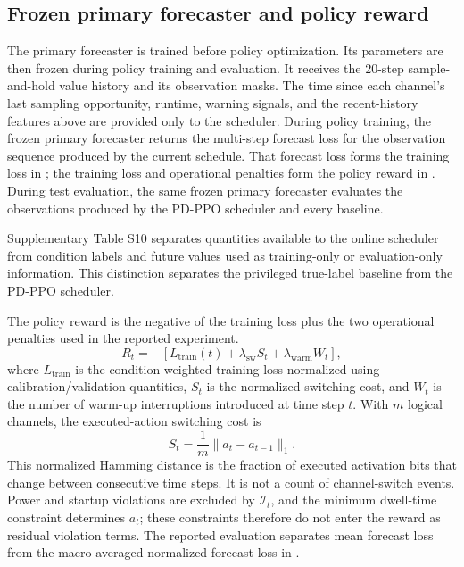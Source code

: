 \subsection{Frozen primary forecaster and policy reward}

The primary forecaster is trained before policy optimization. Its parameters are
then frozen during policy training and evaluation.
It receives the 20-step sample-and-hold value history and its observation masks.
The time since each channel's last sampling opportunity, runtime, warning
signals, and the recent-history features above are provided only to the
scheduler. During policy training, the frozen primary forecaster returns the multi-step
forecast loss for the observation sequence produced by the current schedule.
That forecast loss forms the training loss in
; the training loss and operational
penalties form the policy reward in . During test
evaluation, the same frozen primary forecaster evaluates the observations produced
by the PD-PPO scheduler and every baseline.

Supplementary Table S10 separates quantities available to the online scheduler
from condition labels and future values used as training-only or evaluation-only
information. This distinction separates the privileged true-label baseline from the
PD-PPO scheduler.

The policy reward is the negative of the training loss plus the two operational
penalties used in the reported experiment.
\begin{equation}
  R_t
  =
  -\left[
  L_{\mathrm{train}}(t)
  + \lambda_{\mathrm{sw}} S_t
  + \lambda_{\mathrm{warm}} W_t
  \right],
  \label{eq:training_reward}
\end{equation}
where $L_{\mathrm{train}}$ is the condition-weighted training loss normalized
using calibration/validation quantities, $S_t$ is the normalized switching cost,
and $W_t$ is the number
of warm-up interruptions introduced at time step $t$. With $m$ logical channels,
the executed-action switching cost is
\begin{equation}
  S_t=\frac{1}{m}\lVert a_t-a_{t-1}\rVert_1.
  \label{eq:normalized_switching_cost}
\end{equation}
This normalized Hamming distance is the fraction of executed activation bits that
change between consecutive time steps. It is not a count of channel-switch
events.
Power
and startup violations are excluded by $\mathcal{I}_t$, and the minimum
dwell-time constraint determines $a_t$; these constraints therefore do
not enter the reward as residual violation terms.
The reported evaluation separates mean forecast loss from the macro-averaged
normalized forecast loss in
.

